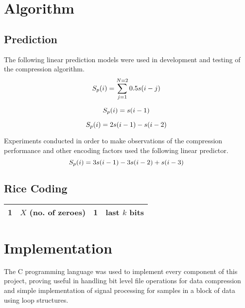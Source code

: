 \documentclass{article}
\begin{document}
\section*{Algorithm}

\subsection*{Prediction}

\cite{makhoul1975linear}

The following linear prediction models were used in development and testing of the compression algorithm.\\

\begin{equation}
S_p(i) = \sum_{j=1}^{N=2} 0.5s(i-j) \\
\end{equation}

\begin{equation}
S_p(i) = s(i-1) \\
\end{equation}

\begin{equation}
S_p(i) = 2s(i-1) - s(i-2) \\
\end{equation}

Experiments conducted in order to make observations of the compression performance and other encoding factors used the following linear predictor. \\

\begin{equation}
S_p(i) = 3s(i-1) - 3s(i-2) + s(i-3) \\
\end{equation}

\subsection*{Rice Coding}

\begin{center}
\begin{tabular}{|r|c|c|l|}
  \hline
  \textbf{1} & $X$ (no. of zeroes) & \textbf{1} & last $k$ bits \\
  \hline
\end{tabular}
\end{center}

\section*{Implementation}
The C programming language was used to implement every component of this project, proving useful in handling bit level file operations for data compression and simple implementation of signal processing for samples in a block of data using loop structures.\\
 
\end{document}
